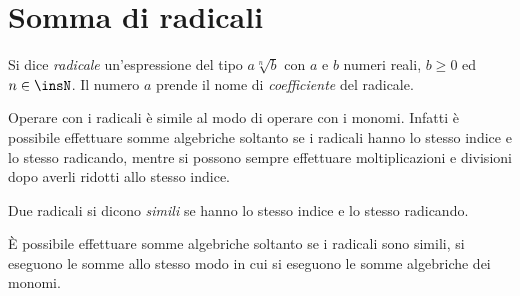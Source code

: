 \section{Somma di radicali}

\begin{definizione}
Si dice \emph{radicale} un'espressione del tipo $a\sqrt[n]b$ con $a$ e $b$ numeri reali, $b{\geq}0$ ed $n\in \insN$. Il numero $a$ prende il nome di \emph{coefficiente} del radicale.
\end{definizione}

Operare con i radicali è simile al modo di operare con i monomi. Infatti è possibile effettuare somme algebriche soltanto se i radicali hanno lo stesso indice e lo stesso radicando, mentre si possono sempre effettuare moltiplicazioni e divisioni dopo averli ridotti allo stesso indice.
\begin{definizione}
 Due radicali si dicono \emph{simili} se hanno lo stesso indice e lo stesso radicando.
\end{definizione}

\`E possibile effettuare somme algebriche soltanto se i radicali sono simili, si eseguono le somme allo stesso modo in cui si eseguono le somme algebriche dei monomi.

